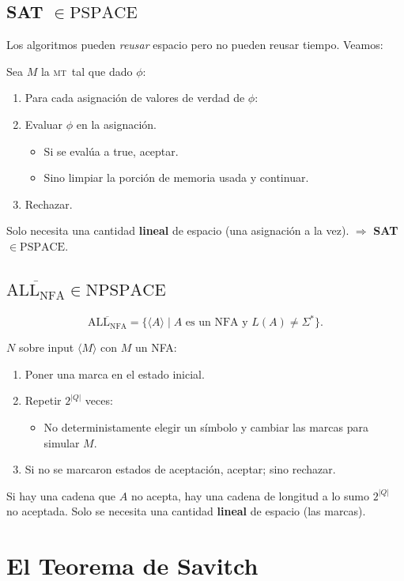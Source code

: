 \documentclass[11pt,a4paper]{article}
\theoremstyle{definicion}
\newcommand{\MT}{\textsc{mt}}
\newcommand{\enc}[1]{\langle #1 \rangle}
\newcommand{\PSPACE}{\mathrm{PSPACE}}
\newcommand{\NPSPACE}{\mathrm{NPSPACE}}
\begin{document}
\subsection{SAT $\in \PSPACE$}

Los algoritmos pueden \emph{reusar} espacio pero no pueden reusar tiempo. Veamos:

Sea $M$ la \MT\ tal que dado $\phi$:
\begin{enumerate}
    \item Para cada asignaci\'on de valores de verdad de $\phi$:
    \item Evaluar $\phi$ en la asignaci\'on.
    \begin{itemize}
        \item Si se eval\'ua a true, aceptar.
        \item Sino limpiar la porci\'on de memoria usada y continuar.
    \end{itemize}
    \item Rechazar.
\end{enumerate}

Solo necesita una cantidad \textbf{lineal} de espacio (una asignaci\'on a la vez). $\Rightarrow$ \textbf{SAT $\in \PSPACE$}.

\subsection{$\overline{\mathrm{ALL}_{\mathrm{NFA}}} \in \NPSPACE$}

\[
\overline{\mathrm{ALL}_{\mathrm{NFA}}} = \{\enc{A} \mid A \text{ es un NFA y } L(A) \neq \Sigma^*\}.
\]

$N$ sobre input $\enc{M}$ con $M$ un NFA:
\begin{enumerate}
    \item Poner una marca en el estado inicial.
    \item Repetir $2^{|Q|}$ veces:
    \begin{itemize}
        \item No deterministamente elegir un s\'imbolo y cambiar las marcas para simular $M$.
    \end{itemize}
    \item Si no se marcaron estados de aceptaci\'on, aceptar; sino rechazar.
\end{enumerate}
Si hay una cadena que $A$ no acepta, hay una cadena de longitud a lo sumo $2^{|Q|}$ no aceptada. Solo se necesita una cantidad \textbf{lineal} de espacio (las marcas).

\section{El Teorema de Savitch}
\end{document}
